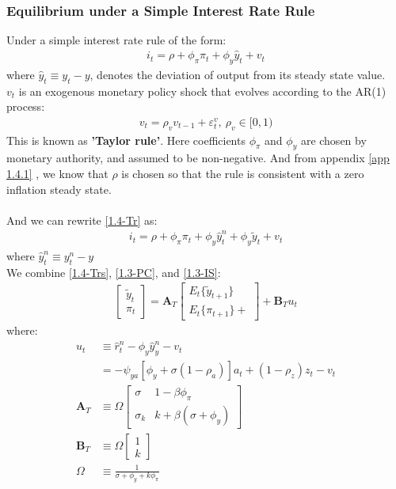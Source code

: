 \documentclass{article}
\numberwithin{equation}{section}
\begin{document}
\subsubsection{Equilibrium under a Simple Interest Rate Rule}
Under a simple interest rate rule of the form:
	\begin{align}
		i_t = \rho + \phi_{\pi} \pi_t + \phi_y \hat{y}_t + v_t \label{1.4-Tr}
	\end{align}
where $\hat{y}_t \equiv y_t - y$, denotes the deviation of output from its steady state value.\\
$v_t$ is an exogenous monetary policy shock that evolves according to the AR(1) process:
	\begin{align*}
		v_t = \rho_v v_{t-1} + \varepsilon^v_t,\ \rho_v \in [0, 1)
	\end{align*}
This is known as \textbf{'Taylor rule'}. Here coefficients $\phi_\pi$ and $\phi_y$ are chosen by monetary authority, and assumed to be non-negative. And from appendix \eqref{app 1.4.1} , we know that $\rho$ is chosen so that the rule is consistent with a zero inflation steady state.\\\\
And we can rewrite \eqref{1.4-Tr} as:
	\begin{align}
		i_t = \rho + \phi_{\pi} \pi_t + \phi_y \hat{y}^n_t + \phi_y \tilde{y}_t + v_t \label{1.4-Trs}
	\end{align}
where $\hat{y}^n_t \equiv y^n_t - y$\\
We combine \eqref{1.4-Trs}, \eqref{1.3-PC}, and \eqref{1.3-IS}:
	\begin{align}
		\begin{bmatrix}
			\tilde{y}_t\\
			\pi_t
		\end{bmatrix} = \textbf{A}_T
		\begin{bmatrix}
			E_t \{ \tilde{y}_{t+1} \}\\
			E_t \{ \pi_{t+1} \} + 
		\end{bmatrix} + \textbf{B}_T u_t \label{1.4-eqs}
	\end{align}
where:
	\begin{align*}
		u_t &\equiv \hat{r}^n_t - \phi_y \hat{y}^n_y - v_t\\
		&= -\psi_{ya} [\phi_y + \sigma(1 - \rho_a)]a_t + (1 - \rho_z)z_t - v_t\\
		\textbf{A}_T &\equiv \Omega \begin{bmatrix}
										\sigma & 1- \beta\phi_\pi\\
										\sigma_k & k + \beta(\sigma + \phi_y)
									\end{bmatrix}\\
		\textbf{B}_T &\equiv \Omega \begin{bmatrix}
										1\\
										k
									\end{bmatrix}\\
		\Omega &\equiv \frac{1}{\sigma + \phi_y + k \phi_\pi}
	\end{align*}
\end{document}
